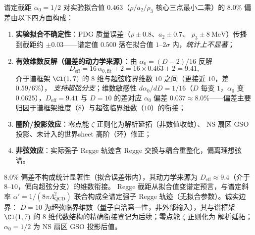 \begin{proposition}[$8.0\%$ 偏差的来源分析]
\label{prop:deviation}
谱定截距 $\alpha_0 = 1/2$ 对实验拟合值 $0.463$（$\rho/a_2/\rho_3$ 核心三点最小二乘）的
$8.0\%$ 偏差由以下四方面构成：
\begin{enumerate}
\item \textbf{实验拟合不确定性}：PDG 质量误差（$\rho \pm 0.8$、$a_2 \pm 0.7$、
$\rho_3 \pm 8\ \mathrm{MeV}$）传播到截距约 $\pm 0.03$——谱定值 $0.500$ 落在拟合值
$1$--$2\sigma$ 内，\emph{统计上不显著}；
\item \textbf{有效维数反解（偏差的动力学来源）}：由 $\alpha_0 = (D-2)/16$ 反解
\begin{equation}
D_{\mathrm{eff}} = 16\,\alpha_{0,\mathrm{fit}} + 2 = 16\times0.463 + 2 = 9.41,
\end{equation}
介于谱框架 $\Cl(1,7)$ 的 $8$ 维与超弦临界维数 $10$ 之间（更接近 $10$，差 $0.59/6\%$），
\emph{支持超弦分支}；维数敏感性 $d\alpha_0/dD = 1/16$（$D$ 每变 $1$，$\alpha_0$ 变
$0.0625$），$D_{\mathrm{eff}} = 9.41$ 与 $D = 10$ 的差对应 $\alpha_0$ 偏差
$0.037 \approx 8.0\%$——偏差主要归因于谱框架维度（$8$）与超弦临界维数（$10$）的衔接；
\item \textbf{圈阶/投影效应}：零点能 $\zeta$ 正则化为解析延拓（非数值收敛）、
NS 扇区 GSO 投影、未计入的世界sheet 高阶（环）修正；
\item \textbf{非弦效应}：实际强子 Regge 轨迹含 Regge 交换与耦合重整化，偏离理想弦谱。
\end{enumerate}
\end{proposition}

\begin{remark}[结论与展望]
$8.0\%$ 偏差不构成统计显著性（拟合误差带内），其动力学来源为
$D_{\mathrm{eff}} \approx 9.4$（介于 $8$--$10$，偏向超弦分支）的维数衔接。
Regge 截距从拟合值变谱定预言，与谱定斜率 $\alpha' = 1/(8\pi\Lambda_{\mathrm{QCD}}^2)$
联合构成全谱定强子 Regge 轨迹（无拟合参数）。诚实边界：
$D = 10$ 为超弦临界维数（量子自洽第一性，非外部输入），其与谱框架
$\Cl(1,7)$ 的 $8$ 维代数结构的精确衔接登记为后续；零点能 $\zeta$ 正则化为
解析延拓；$\alpha_0 = 1/2$ 为 NS 扇区 GSO 投影后值。
\end{remark}
